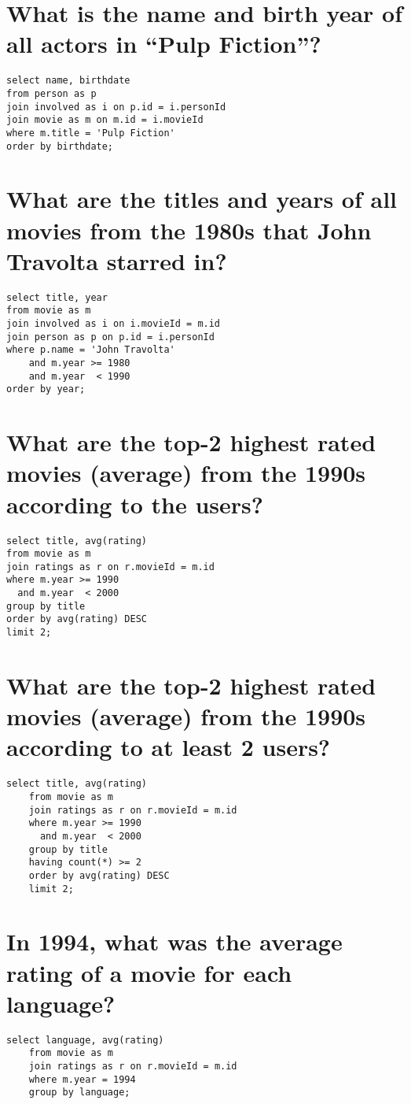 \documentclass[a4paper,11pt]{memoir}
\begin{document}
\section{What is the name and birth year of all actors in ``Pulp Fiction''?}
\begin{lstlisting}
select name, birthdate
from person as p
join involved as i on p.id = i.personId
join movie as m on m.id = i.movieId
where m.title = 'Pulp Fiction'
order by birthdate;
\end{lstlisting}

\section{What are the titles and years of all movies from the 1980s that John Travolta starred in?}
\begin{lstlisting}
select title, year
from movie as m
join involved as i on i.movieId = m.id
join person as p on p.id = i.personId
where p.name = 'John Travolta' 
	and m.year >= 1980 
	and m.year  < 1990
order by year;
\end{lstlisting}

\section{What are the top-2 highest rated movies (average) from the 1990s according to the users?}
\begin{lstlisting}
select title, avg(rating)
from movie as m
join ratings as r on r.movieId = m.id
where m.year >= 1990 
  and m.year  < 2000
group by title
order by avg(rating) DESC
limit 2;

\end{lstlisting}

\section{What are the top-2 highest rated movies (average) from the 1990s according to at least 2 users?}
\begin{lstlisting}
select title, avg(rating)
	from movie as m
	join ratings as r on r.movieId = m.id
	where m.year >= 1990 
	  and m.year  < 2000
	group by title
	having count(*) >= 2
	order by avg(rating) DESC
	limit 2;
\end{lstlisting}

\section{In 1994, what was the average rating of a movie for each language?}
\begin{lstlisting}
select language, avg(rating)
	from movie as m
	join ratings as r on r.movieId = m.id
	where m.year = 1994
	group by language;
\end{lstlisting}
\end{document}
